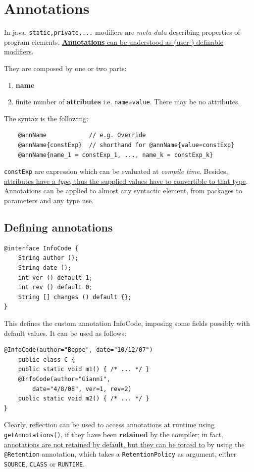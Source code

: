 \section{Annotations}
In java, \lstinline{static,private,...} modifiers are \textit{meta-data} describing properties of program elements.
\ul{\textbf{Annotations} can be understood as (user-) definable modifiers}.
{They are composed by one or two parts:\ns
\begin{enumerate}
    \item \textbf{name}
    \item finite number of \textbf{attributes} i.e. \lstinline{name=value}.
    There may be no attributes.
\end{enumerate}}
The syntax is the following:
\begin{lstlisting}
    @annName            // e.g. Override
    @annName{constExp}  // shorthand for @annName{value=constExp}
    @annName{name_1 = constExp_1, ..., name_k = constExp_k}
\end{lstlisting}
\lstinline{constExp} are expression which can be evaluated at \textit{compile time}.
Besides, \ul{attributes have a \textit{type}, thus the supplied values have to
convertible to that type}.\\
Annotations can be applied to almost any syntactic element, from packages to parameters and any type use.

\subsection{Defining annotations}
\begin{lstlisting}
@interface InfoCode {
    String author ();
    String date ();
    int ver () default 1;
    int rev () default 0;
    String [] changes () default {};
}
\end{lstlisting}

This defines the custom annotation InfoCode, imposing some fields possibly with default values.
It can be used as follows:
\begin{lstlisting}
@InfoCode(author="Beppe", date="10/12/07")
    public class C {
    public static void m1() { /* ... */ }
    @InfoCode(author="Gianni",
        date="4/8/08", ver=1, rev=2)
    public static void m2() { /* ... */ }
}
\end{lstlisting}

Clearly, reflection can be used to access annotations at runtime using \lstinline|getAnnotations()|, if they have been \textbf{retained} by the compiler;
in fact, \ul{annotations are not retained by default, but they can be forced to} by using the \lstinline{@Retention} annotation, which takes a \lstinline{RetentionPolicy} as argument, either \lstinline{SOURCE}, \lstinline{CLASS} or \lstinline{RUNTIME}.